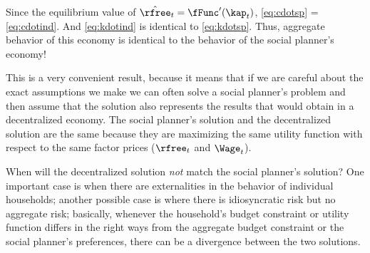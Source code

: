 \documentclass{handout}
\begin{document}
Since the equilibrium value of $\hat{\rfree}_{t}=\fFunc^{\prime}(\kap_{t})$, 
\eqref{eq:cdotsp} = \eqref{eq:cdotind}.  And \eqref{eq:kdotind} is 
identical to \eqref{eq:kdotsp}.  Thus, aggregate behavior of this economy 
is identical to the behavior of the social planner's economy!

This is a very convenient result, because it means that if we are 
careful about the exact assumptions we make we can often solve a 
social planner's problem and then assume that the solution also 
represents the results that would obtain in a decentralized economy.  
The social planner's solution and the decentralized solution are the 
same because they are maximizing the same utility function with 
respect to the same factor prices ($\rfree_{t}$ and $\Wage_{t}$).

When will the decentralized solution {\it not} match the social 
planner's solution?  One important case is when there are 
externalities in the behavior of individual households; another 
possible case is where there is idiosyncratic risk but no aggregate 
risk; basically, whenever the household's budget constraint or utility 
function differs in the right ways from the aggregate budget 
constraint or the social planner's preferences, there can be a 
divergence between the two solutions.

 

\end{document}
